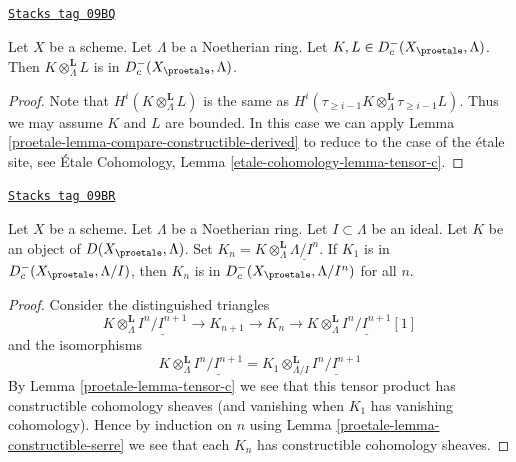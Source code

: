 \begin{lemma}[Tensor c]
\label{proetale-lemma-tensor-c}
\href{https://stacks.math.columbia.edu/tag/09BQ}{\texttt{Stacks tag 09BQ}}

Let $X$ be a scheme. Let $\Lambda$ be a Noetherian ring.
Let $K, L \in D_c^-(X_\proetale, \Lambda)$. Then
$K \otimes_\Lambda^\mathbf{L} L$ is in $D_c^-(X_\proetale, \Lambda)$.
\end{lemma}

\begin{proof}

Note that $H^i(K \otimes_\Lambda^\mathbf{L} L)$ is the same as
$H^i(\tau_{\geq i - 1}K \otimes_\Lambda^\mathbf{L} \tau_{\geq i - 1}L)$.
Thus we may assume $K$ and $L$ are bounded.
In this case we can apply Lemma \ref{proetale-lemma-compare-constructible-derived} to
reduce to the case of the \'etale site, see
\'Etale Cohomology, Lemma \ref{etale-cohomology-lemma-tensor-c}.
\end{proof}

\begin{lemma}
\label{proetale-lemma-compare-truncations-constructible}
\href{https://stacks.math.columbia.edu/tag/09BR}{\texttt{Stacks tag 09BR}}

Let $X$ be a scheme. Let $\Lambda$ be a Noetherian ring.
Let $I \subset \Lambda$ be an ideal.
Let $K$ be an object of $D(X_\proetale, \Lambda)$.
Set $K_n = K \otimes_\Lambda^\mathbf{L} \underline{\Lambda/I^n}$.
If $K_1$ is in $D^-_c(X_\proetale, \Lambda/I)$, then
$K_n$ is in $D^-_c(X_\proetale, \Lambda/I^n)$ for all $n$.
\end{lemma}

\begin{proof}

Consider the distinguished triangles
$$
K \otimes_\Lambda^\mathbf{L} \underline{I^n/I^{n + 1}} \to
K_{n + 1} \to
K_n \to
K \otimes_\Lambda^\mathbf{L} \underline{I^n/I^{n + 1}}[1]
$$
and the isomorphisms
$$
K \otimes_\Lambda^\mathbf{L} \underline{I^n/I^{n + 1}} =
K_1 \otimes_{\Lambda/I}^\mathbf{L} \underline{I^n/I^{n + 1}}
$$
By Lemma \ref{proetale-lemma-tensor-c} we see that this tensor product has
constructible cohomology sheaves (and vanishing when $K_1$ has
vanishing cohomology). Hence by induction on $n$ using
Lemma \ref{proetale-lemma-constructible-serre}
we see that each $K_n$ has constructible cohomology sheaves.
\end{proof}

